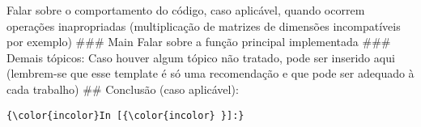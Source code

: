 \documentclass[11pt]{article}
\begin{document}
Falar sobre o comportamento do código, caso aplicável, quando ocorrem
operações inapropriadas (multiplicação de matrizes de dimensões
incompatíveis por exemplo) \#\#\# Main Falar sobre a função principal
implementada \#\#\# Demais tópicos: Caso houver algum tópico não
tratado, pode ser inserido aqui (lembrem-se que esse template é só uma
recomendação e que pode ser adequado à cada trabalho) \#\# Conclusão
(caso aplicável):

    \begin{Verbatim}[commandchars=\\\{\}]
{\color{incolor}In [{\color{incolor} }]:} 
\end{Verbatim}



    
    
    
    
\end{document}
